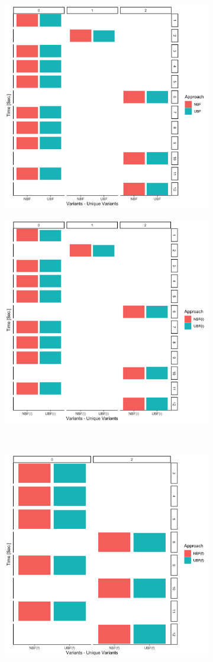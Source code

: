 \begin{figure}
\begin{subfigure}{.5\linewidth}
\centering
\includegraphics[width=.7\textwidth]{figs/plots/emp-nbf-ubf.png}
\caption{}
\label{fig:sub1}
\end{subfigure}%
\begin{subfigure}{.5\linewidth}
\centering
\includegraphics[width=.7\textwidth]{figs/plots/emp-nbfi-ubfi.png}
\caption{}
\label{fig:sub2}
\end{subfigure}\\[1ex]
\begin{subfigure}{0.5\linewidth}
\centering
\includegraphics[width=.7\textwidth]{figs/plots/emp-nbff-ubff.png}

\end{subfigure}
\end{figure}
